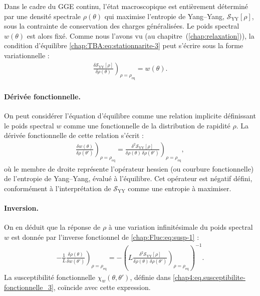 \begin{mdframed}
\medskip

Dans le cadre du GGE continu, l’état macroscopique est entièrement déterminé par une densité spectrale $\rho(\theta)$ qui maximise l’entropie de Yang–Yang, $\mathcal{S}_{\mathrm{YY}}[\rho]$, sous la contrainte de conservation des charges généralisées. Le poids spectral $w(\theta)$ est alors fixé.  
Comme nous l’avons vu (au chapitre~(\ref{chap:relaxation})), la condition d’équilibre \eqref{chap:TBA:eq:stationnarite-3} peut s’écrire sous la forme variationnelle :
\begin{eqnarray}
	\left. \frac{\delta \mathcal{S}_{\mathrm{YY}}[\rho]}{\delta \rho(\theta)} \right)_{\rho = \rho_{\mathrm{eq}}} = w(\theta). \label{chap:Fluc:eq:stationnarite-3}
\end{eqnarray}

\end{mdframed}


\medskip
\paragraph{Dérivée fonctionnelle.}
On peut considérer l’équation d’équilibre comme une relation implicite définissant le poids spectral $w$ comme une fonctionnelle de la distribution de rapidité $\rho$. La dérivée fonctionnelle de cette relation s’écrit :
\begin{eqnarray}
	\left. \frac{\delta w(\theta)}{\delta \rho(\theta')} \right)_{\rho = \rho_{\mathrm{eq}}} = \left. \frac{\delta^2 \mathcal{S}_{\mathrm{YY}}[\rho]}{\delta \rho(\theta)\, \delta \rho(\theta')} \right)_{\rho = \rho_{\mathrm{eq}}}, \label{chap:Fluc:eq:susp-1}
\end{eqnarray}
où le membre de droite représente l’opérateur hessien (ou courbure fonctionnelle) de l'entropie de Yang–Yang, évalué à l’équilibre. Cet opérateur est négatif défini, conformément à l’interprétation de $\mathcal{S}_{\mathrm{YY}}$ comme une entropie à maximiser.

\paragraph{Inversion.}
On en déduit que la réponse de $\rho$ à une variation infinitésimale du poids spectral $w$ est donnée par l'inverse fonctionnel de \eqref{chap:Fluc:eq:susp-1} :
\begin{eqnarray}
	-\frac{1}{L} \left. \frac{\delta \rho(\theta)}{\delta w(\theta')} \right)_{\rho = \rho_{\mathrm{eq}}} = - \left( L \left. \frac{\delta^2 \mathcal{S}_{\mathrm{YY}}[\rho]}{\delta \rho(\theta)\, \delta \rho(\theta')} \right)_{\rho = \rho_{\mathrm{eq}}} \right)^{-1}. \label{chap:Fluc:eq:susp-2}
\end{eqnarray}
La susceptibilité fonctionnelle $\chi_w(\theta, \theta')$, définie dans \eqref{chap4:eq.susceptibilite-fonctionnelle_3}, coïncide avec cette expression.





